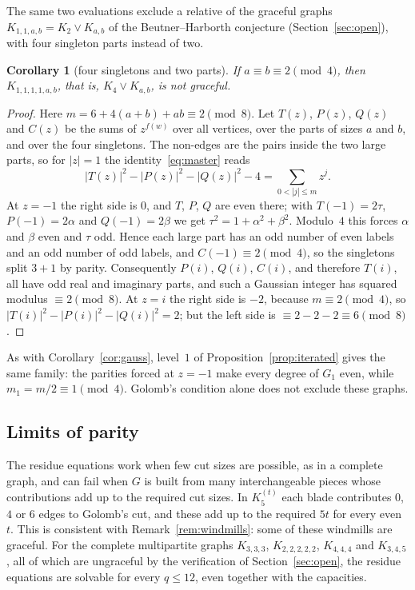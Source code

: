 \documentclass[11pt]{amsart}
\newcommand{\thmmarker}{}
\newcommand{\mnew}{\gdef\thmmarker{\textsuperscript{$\star$}}}
\theoremstyle{tplain}
\newtheorem{corollary}[theorem]{Corollary}
\theoremstyle{tdefinition}
\theoremstyle{tremark}
\begin{document}
The same two evaluations exclude a relative of the graceful graphs
$K_{1,1,a,b}=K_2\vee K_{a,b}$ of the Beutner--Harborth conjecture
(Section~\ref{sec:open}), with four singleton parts instead of two.

\mnew\begin{corollary}[four singletons and two parts]\label{cor:gausstwo}
If $a\equiv b\equiv2\pmod4$, then $K_{1,1,1,1,a,b}$, that is,
$K_4\vee K_{a,b}$, is not graceful.
\end{corollary}

\begin{proof}
Here $m=6+4(a+b)+ab\equiv2\pmod8$. Let $T(z)$, $P(z)$, $Q(z)$ and $C(z)$ be
the sums of $z^{f(w)}$ over all vertices, over the parts of sizes $a$ and
$b$, and over the four singletons. The non-edges are the pairs inside the two
large parts, so for $|z|=1$ the identity~\eqref{eq:master} reads
\[
 |T(z)|^2-|P(z)|^2-|Q(z)|^2-4=\sum_{0<|j|\le m}z^j .
\]
At $z=-1$ the right side is $0$, and $T$, $P$, $Q$ are even there; with
$T(-1)=2\tau$, $P(-1)=2\alpha$ and $Q(-1)=2\beta$ we get
$\tau^2=1+\alpha^2+\beta^2$. Modulo~$4$ this forces $\alpha$ and $\beta$ even
and $\tau$ odd. Hence each large part has an odd number of even labels and an
odd number of odd labels, and $C(-1)\equiv2\pmod4$, so the singletons split
$3+1$ by parity. Consequently $P(i)$, $Q(i)$, $C(i)$, and therefore
$T(i)$, all have odd real and imaginary parts, and such a Gaussian integer has
squared modulus $\equiv2\pmod8$. At $z=i$ the right side is $-2$, because
$m\equiv2\pmod4$, so $|T(i)|^2-|P(i)|^2-|Q(i)|^2=2$; but the left side is
$\equiv2-2-2\equiv6\pmod8$.
\end{proof}

As with Corollary~\ref{cor:gauss}, level~$1$ of
Proposition~\ref{prop:iterated} gives the same family: the parities forced at
$z=-1$ make every degree of $G_1$ even, while $m_1=m/2\equiv1\pmod4$.
Golomb's condition alone does not exclude these graphs.

\subsection{Limits of parity}\label{sec:cannot}

The residue equations work when few cut sizes are possible, as in a
complete graph, and can fail when $G$ is built from many interchangeable
pieces whose contributions add up to the required cut sizes. In $K_5^{(t)}$ each blade
contributes $0$, $4$ or $6$ edges to Golomb's cut, and these add up to the
required $5t$ for every even~$t$. This is consistent with
Remark~\ref{rem:windmills}: some of these windmills are graceful. For the
complete multipartite graphs $K_{3,3,3}$, $K_{2,2,2,2,2}$, $K_{4,4,4}$ and
$K_{3,4,5}$, all of which are ungraceful by the verification of
Section~\ref{sec:open}, the residue equations are solvable for every
$q\le12$, even together with the capacities.
\end{document}
